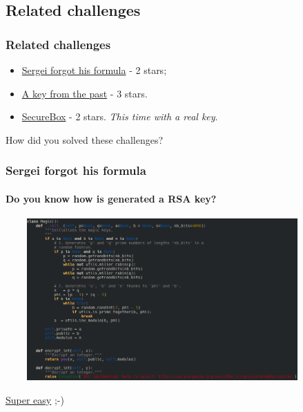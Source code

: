 \documentclass[]{beamer}
\begin{document}
\subsection{Related challenges}
\begin{frame}
\frametitle{Related challenges}
\begin{itemize}
\item \href{https://github.com/cscluxembourg/vestatech/blob/master/challenges/Sergei_forgot_his_formula/wip.py}{Sergei forgot his formula} - 2 stars;
\item \href{https://github.com/cscluxembourg/vestatech/tree/master/challenges/A_key_from_the_past}{A key from the past} - 3 stars.
\item \href{https://github.com/cscluxembourg/vestatech/tree/master/challenges/SecureBox}{SecureBox} - 2 stars. \textit{This time with a real key}.
\end{itemize}
\bigskip
How did you solved these challenges?
\end{frame}

\begin{frame}
\frametitle{Sergei forgot his formula}
\framesubtitle{Do you know how is generated a RSA key?}
\begin{center}
\includegraphics[height=6.2cm, width=12.0cm]{./images/RSA-algo-key-generation.png}
\end{center}
\href{https://en.wikipedia.org/wiki/RSA_(cryptosystem)\#Decryption}{Super easy} ;-)
\end{frame}
\end{document}
